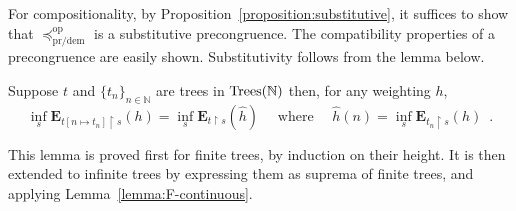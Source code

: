 \documentclass[a4paper,UKenglish]{lipics-v2018}
\newcommand{\Nat}{\mathbb{N}}
\newcommand{\Tree}{\textnormal{Trees}} %
\newcommand{\Basicleq}{\preccurlyeq}
\newcommand{\prang}{\text{pr/ang}}
\newcommand{\prdem}{\text{pr/dem}}
\newcommand{\Op}{\text{op}}
\theoremstyle{plain}
\begin{document}
For compositionality, by Proposition~\ref{proposition:substitutive}, it suffices to show
that $\Basicleq^\Op_\prdem$ is a substitutive precongruence. The compatibility properties 
of a precongruence are easily shown. Substitutivity follows from the lemma below.
%
\begin{lemma}
Suppose $t$ and 
$\{ t_n \}_{n \in \mathbb{N}}$ are trees in 
            $\Tree(\Nat)$ then, for any weighting $h$,
             \begin{equation*}
                \inf_s \mathbf{E}_{t [ n \mapsto t_n ] \restriction  s } (h)
                = 
                \inf_s \mathbf{E}_{t \restriction  s} (\hat{h})
                \quad \text{ where } \quad \hat{h} (n) = \inf_s \mathbf{E}_{t_n \restriction  s} (h) \enspace .
            \end{equation*}
\end{lemma}
This lemma is proved first for finite trees, by induction on their height. It is then extended to infinite trees
by expressing them as suprema of finite trees, and applying Lemma~\ref{lemma:F-continuous}.
%
%            
%
%
% 
\end{document}
